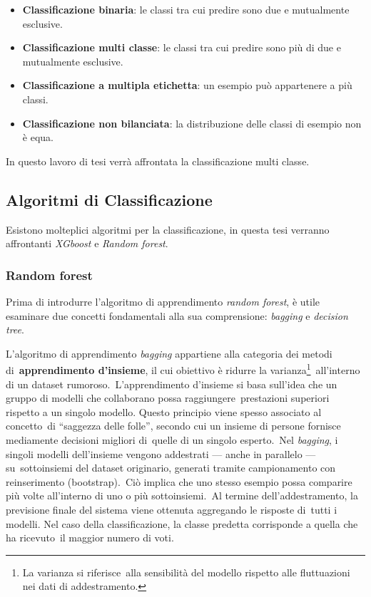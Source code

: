\begin{itemize}
      \item \textbf{Classificazione binaria}: le classi tra cui predire sono due e mutualmente esclusive.
      \item \textbf{Classificazione multi classe}: le classi tra cui predire sono più di due e mutualmente esclusive.
      \item \textbf{Classificazione a multipla etichetta}: un esempio può appartenere a più classi.
      \item \textbf{Classificazione non bilanciata}: la distribuzione delle classi di esempio non è equa.
\end{itemize}

In questo lavoro di tesi verrà affrontata la classificazione multi classe.

\subsection{Algoritmi di Classificazione}

Esistono molteplici algoritmi per la classificazione, in questa tesi verranno affrontanti \textit{XGboost} e \textit{Random forest}.

\subsubsection{Random forest}

Prima di introdurre l'algoritmo di apprendimento \textit{random forest}, è utile esaminare due concetti
fondamentali alla sua comprensione: \textit{bagging} e \textit{decision tree}.

L'algoritmo di apprendimento \textit{bagging} appartiene alla categoria dei metodi di\
\textbf{apprendimento d'insieme}, il cui obiettivo è ridurre la varianza\footnote{La varianza si riferisce\
      alla sensibilità del modello rispetto alle fluttuazioni nei dati di addestramento.}\
all'interno di un dataset rumoroso.\
L'apprendimento d'insieme si basa sull'idea che un gruppo di modelli che collaborano possa raggiungere\
prestazioni superiori rispetto a un singolo modello. Questo principio viene spesso associato al concetto\
di ``saggezza delle folle'', secondo cui un insieme di persone fornisce mediamente decisioni migliori di\
quelle di un singolo esperto.\
Nel \textit{bagging}, i singoli modelli dell'insieme vengono addestrati --- anche in parallelo --- su\
sottoinsiemi del dataset originario, generati tramite campionamento con reinserimento (bootstrap).\
Ciò implica che uno stesso esempio possa comparire più volte all'interno di uno o più sottoinsiemi.\
Al termine dell'addestramento, la previsione finale del sistema viene ottenuta aggregando le risposte di\
tutti i modelli. Nel caso della classificazione, la classe predetta corrisponde a quella che ha ricevuto\
il maggior numero di voti.

